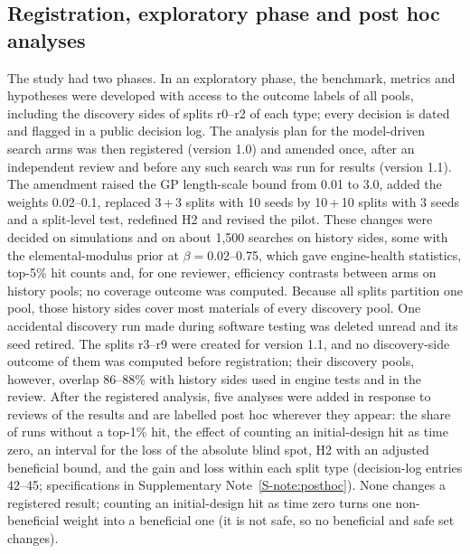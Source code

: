 \subsection{Registration, exploratory phase and post hoc analyses}\label{sec:registration}
The study had two phases. In an exploratory phase, the benchmark, metrics and hypotheses were developed with access to the outcome
labels of all pools, including the discovery sides of splits r0--r2 of each type; every decision is dated and flagged in a public
decision log. The analysis plan for the model-driven search arms was then registered (version 1.0\cite{asad2026registrationv1}) and amended once,
after an independent review and before any such search was run for results (version 1.1\cite{asad2026registration}). The amendment raised the
GP length-scale bound from 0.01 to 3.0, added the weights 0.02--0.1, replaced 3\,+\,3 splits with 10 seeds by 10\,+\,10 splits with
3 seeds and a split-level test, redefined H2 and revised the pilot. These changes were decided on simulations and on about 1,500
searches on history sides, some with the elemental-modulus prior at $\beta=0.02$--0.75, which gave engine-health statistics, top-5\%
hit counts and, for one reviewer, efficiency contrasts between arms on history pools; no coverage outcome was computed. Because all
splits partition one pool, those history sides cover most materials of every discovery pool. One accidental discovery
run made during software testing was deleted unread and its seed retired. The splits r3--r9 were created for version 1.1, and no
discovery-side outcome of them was computed before registration; their discovery pools, however, overlap 86--88\% with history
sides used in engine tests and in the review. After the registered analysis, five analyses were added in response to
reviews of the results and are labelled post hoc wherever they appear: the share of runs without a top-1\% hit, the effect of
counting an initial-design hit as time zero, an interval for the loss of the absolute blind spot, H2 with an adjusted
beneficial bound, and the gain and loss within each split type (decision-log entries 42--45; specifications in Supplementary
Note~\ref{S-note:posthoc}). None changes a registered result; counting an initial-design hit as time zero turns one non-beneficial weight into a
beneficial one (it is not safe, so no beneficial and safe set changes).
